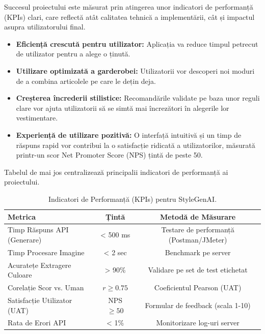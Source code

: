 Succesul proiectului este măsurat prin atingerea unor indicatori de performanță (KPIs) clari, care reflectă atât calitatea tehnică a implementării, cât și impactul asupra utilizatorului final.

\begin{itemize}
    \item \textbf{Eficiență crescută pentru utilizator:} Aplicația va reduce timpul petrecut de utilizator pentru a alege o ținută.
    \item \textbf{Utilizare optimizată a garderobei:} Utilizatorii vor descoperi noi moduri de a combina articolele pe care le dețin deja.
    \item \textbf{Creșterea încrederii stilistice:} Recomandările validate pe baza unor reguli clare vor ajuta utilizatorii să se simtă mai încrezători în alegerile lor vestimentare.
    \item \textbf{Experiență de utilizare pozitivă:} O interfață intuitivă și un timp de răspuns rapid vor contribui la o satisfacție ridicată a utilizatorilor, măsurată printr-un scor Net Promoter Score (NPS) țintă de peste 50.
\end{itemize}

Tabelul de mai jos centralizează principalii indicatori de performanță ai proiectului.

\begin{table}[h]
    \centering
    \begin{tabular}{|l|c|c|}
    \hline
    \textbf{Metrica} & \textbf{Țintă} & \textbf{Metodă de Măsurare} \\ \hline
    Timp Răspuns API (Generare) & < 500 ms & Testare de performanță (Postman/JMeter) \\ \hline
    Timp Procesare Imagine & < 2 sec & Benchmark pe server \\ \hline
    Acuratețe Extragere Culoare & > 90\% & Validare pe set de test etichetat \\ \hline
    Corelație Scor vs. Uman & $r \geq 0.75$ & Coeficientul Pearson (UAT) \\ \hline
    Satisfacție Utilizator (UAT) & NPS $\geq 50$ & Formular de feedback (scala 1-10) \\ \hline
    Rata de Erori API & < 1\% & Monitorizare log-uri server \\ \hline
    \end{tabular}
    \caption{Indicatori de Performanță (KPIs) pentru StyleGenAI.}
    \label{tab:kpis}
\end{table}

